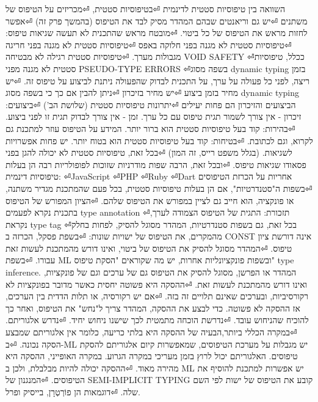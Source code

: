 \begin{טבלא}[!htbp]
      השוואה בין טיפוסיות סטטית לדינמית
⏎בטיפוסיות סטטית,
⏎מכריזים על הטיפוס של משתנים
⏎יש גם וריאנטים שבהם המהדר מסיק לבד את הטיפוס (בהמשך פרק זה)
⏎אפשר לחזות מראש את הטיפוס של כל ביטוי.
⏎מובטח מראש שהתכנית לא תעשה שגיאות טיפוס:
⏎טיפוסיות סטטית לא מגנה בפני חלוקה באפס
⏎טיפוסיות סטטית לא מגנה בפני חריגה מגבולות מערך.
⏎טיפוסיות סטטית רגילה לא מבטיחה VOID SAFETY
⏎ככלל, טיפוסיות סטטית לא מגנה מפני PSEUDO-TYPE ERRORS
⏎בשפה מסוג dynamic typing בזמן ריצה, לפני כל פעולה על ערך, על התכנית לבדוק שהפעולה ניתנת לביצוע על טיפוס זה.
⏎יש מחיר בזמן ביצוע
⏎יש מחיר בזיכרון
⏎ניתן להבין אם כך כי בשפה מסוג dynamic typing הביצועים והזיכרון הם פחות יעילים
⏎יתרונות טיפוסיות סטטית (שלושת הב')
⏎ביצועים: זיכרון - אין צורך לשמור תגית טיפוס עם כל ערך. זמן - אין צורך לבדוק תגית זו לפני ביצוע.
⏎בהירות: קוד בעל טיפוסיות סטטית הוא ברור יותר. המידע על הטיפוס עוזר למתכנת גם לקרוא, וגם לכתובת.
⏎בטיחות: קוד בעל טיפוסיות סטטית הוא בטוח יותר. יש פחות אפשרויות לשגיאות. (בגלל משפט רייס, זה המון)
⏎בכל זאת, טיפוסיות סטטית לא יכולה להגן בפני פסאודו שגיאות טיפוס.
⏎ובכל זאת, הרבה שפות מודרניות שזוכות לפופולריות רבה הן בעלות טיפוסיות דינמית:
⏎JavaScript
⏎PHP
⏎Ruby
⏎Dart
      אחריות על הכרזת הטיפוסים
⏎בשפות ה"סטנדרטיות", אם הן בעלות טיפוסיות סטטית, בכל פעם שהמתכנת מגדיר משתנה, או פונקציה, הוא חייב גם לציין במפורש את הטיפוס שלהם.
⏎הציון המפורש של הטיפוס בתכנית נקרא לפעמים type annotation
⏎תזכורת: התגית של הטיפוס הצמודה לערך, נקראת type tag
⏎בכל זאת, גם בשפות סטנדרטיות, המהדר מסוגל להסיק, לפחות בחלק מהמקרים, את הטיפוס של ישויות שונות:
⏎בשפת פסקל, הכרזה ב CONST אינה דורשת ציון טיפוס.
⏎המהדר מסוגל להסיק את הטיפוס של ביטוי, ואינו דורש מהמתכנת לעשות זאת עבורו.
⏎בשפת ML ובשפות פונקציונליות אחרות, יש מה שקוראים "הסקת טיפוס" type inference. המהדר או הפרשן, מסוגל להסיק את הטיפוס גם של ערכים וגם של פונקציות, ואינו דורש מהמתכנת לעשות זאת.
⏎ההסקה היא פשוטה יחסית כאשר מדובר בפונקציות לא רקורסיביות, ובערכים שאינם תלויים זה בזה.
⏎אם יש רקורסיה, או תלות הדדית בין הערכים, אז ההסקה לא פשוטה. כדי לבצע את ההסקה, המהדר צריך ל"נחש" את הטיפוס, ואחר כך להוכיח שהניחוש עובד.
⏎נדרשת הוכחה מתמטית לכך שישנו ניחוש יחיד.
⏎נדרש אלגוריתם.
⏎במקרה הכללי ביותר,הבעיה של ההסקה היא בלתי כריעה, כלומר אין אלגוריתם שמבצע הסקה נכונה.
⏎ב-ML יש מגבלות על מערכת הטיפוסים, שמאפשרות קיום אלגוריתם להסקת טיפוסים. האלגוריתם יכול לרוץ בזמן מעריכי במקרה הגרוע. במקרה האופייני, ההסקה היא מהירה מאוד.
⏎ההסקה יכולה להיות מבלבלת, ולכן ב ML יש אפשרות למתכנת להוסיף את הטיפוסים.
⏎המנגנון של SEMI-IMPLICIT TYPING קובע את הטיפוס של ישות לפי השם שלה.
⏎דוגמאות הן פוֹרְטְרָן, בייסיק ופרל.


\end{טבלא}
